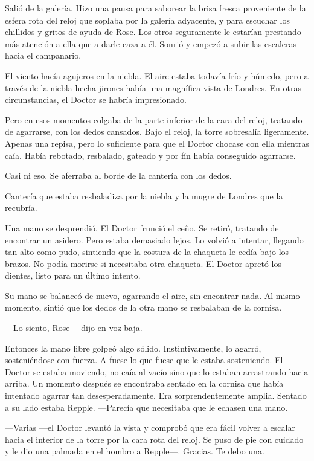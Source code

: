 {Salió de la galería. Hizo una pausa para saborear la brisa fresca
	proveniente de la esfera rota del reloj que soplaba por la galería
	adyacente, y para escuchar los chillidos y gritos de ayuda de Rose. Los
	otros seguramente le estarían prestando más atención a ella que a darle
caza a él. Sonrió y empezó a subir las escaleras hacia el campanario.}

{El viento hacía agujeros en la niebla. El aire estaba todavía frío y
	húmedo, pero a través de la niebla hecha jirones había una magnífica
	vista de Londres. En otras circunstancias, el Doctor se habría
impresionado.}

{Pero en esos momentos colgaba de la parte inferior de la cara del
	reloj, tratando de agarrarse, con los dedos cansados. Bajo el reloj, la
	torre sobresalía ligeramente. Apenas una repisa, pero lo suficiente para
	que el Doctor chocase con ella mientras caía. Había rebotado, resbalado,
gateado y por fín había conseguido agarrarse.}

{Casi ni eso. Se aferraba al borde de la cantería con los dedos.}

{Cantería que estaba resbaladiza por la niebla y la mugre de Londres que
la recubría.}

{Una mano se desprendió. El Doctor frunció el ceño. Se retiró, tratando
	de encontrar un asidero. Pero estaba demasiado lejos. Lo volvió a
	intentar, llegando tan alto como pudo, sintiendo que la costura de la
	chaqueta le cedía bajo los brazos. No podía morirse si necesitaba otra
chaqueta. El Doctor apretó los dientes, listo para un último intento.}

{Su mano se balanceó de nuevo, agarrando el aire, sin encontrar nada. Al
	mismo momento, sintió que los dedos de la otra mano se resbalaban de la
cornisa.}

{---Lo siento, Rose ---dijo en voz baja.}

{Entonces la mano libre golpeó algo sólido. Instintivamente, lo agarró,
	sosteniéndose con fuerza. A fuese lo que fuese que le estaba
	sosteniendo. El Doctor se estaba moviendo, no caía al vacío sino que lo
	estaban arrastrando hacia arriba. Un momento después se encontraba
	sentado en la cornisa que había intentado agarrar tan desesperadamente.
	Era sorprendentemente amplia. Sentado a su lado estaba Repple.
---Parecía que necesitaba que le echasen una mano.}

{---Varias ---el Doctor levantó la vista y comprobó que era fácil volver
	a escalar hacia el interior de la torre por la cara rota del reloj. Se
	puso de pie con cuidado y le dio una palmada en el hombro a Repple---.
Gracias. Te debo una.}

